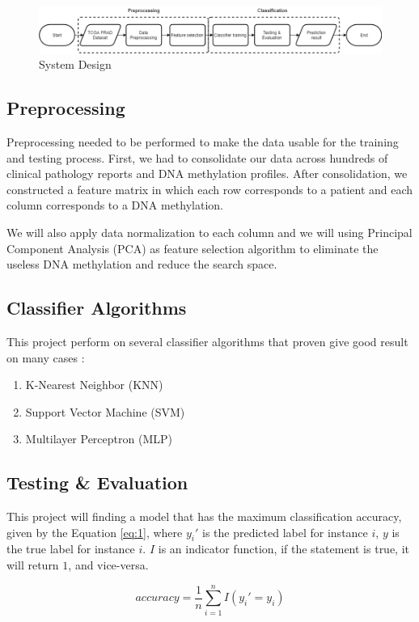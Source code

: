 \documentclass[a4paper,oneside]{article}
\begin{document}
\begin{figure}
  \includegraphics[width=0.9\linewidth]{system_design}
  \centering
  \caption{System Design}
  \label{fig:system_design}
\end{figure}

\subsection{Preprocessing}
Preprocessing needed to be performed to make the data usable for the training and testing process. First, we had to consolidate our data across hundreds of clinical pathology reports and DNA methylation profiles. After consolidation, we constructed a feature matrix in which each row corresponds to a patient and each column corresponds to a DNA methylation.
\par
We will also apply data normalization to each column and we will using Principal Component Analysis (PCA) as feature selection algorithm to eliminate the useless DNA methylation and reduce the search space.

\subsection{Classifier Algorithms}

This project perform on several classifier algorithms that proven give good result on many cases \cite{three} :
\begin{enumerate}
\item K-Nearest Neighbor (KNN)
\item Support Vector Machine (SVM)
\item Multilayer Perceptron (MLP)
\end{enumerate}

\subsection{Testing \& Evaluation}
This project will finding a model that has the maximum classification accuracy, given by the Equation \ref{eq:1}, where $y_{i}'$ is the predicted label for instance $i$, $y$ is the true label for instance $i$. $I$ is an indicator function, if the statement is true, it will return $1$, and vice-versa.

\begin{equation} \label{eq:1}
accuracy =  \frac{1}{n}  \sum_{i=1}^n  I(y_{i}' = y_{i})
\end{equation}
\end{document}
